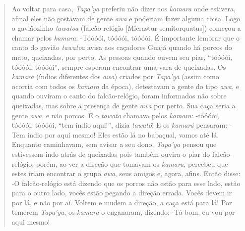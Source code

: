 \begin{quote}
Ao voltar para casa, \emph{Tapa'ya} preferiu não dizer aos \emph{kamara}
onde estivera, afinal eles não gostavam de gente \emph{awa} e poderiam
fazer alguma coisa. Logo o gaviãozinho \emph{tawatoa} (falcão-relógio
{[}Micrastur semitorquatus{]}) começou a chamar pelos \emph{kamara}:
-Tóóóói, tóóóói, tóóóói. É importante lembrar que o canto do gavião
\emph{tawatoa} avisa aos caçadores Guajá quando há porcos do mato,
queixadas, por perto. As pessoas quando ouvem seu piar, ``tóóóói,
tóóóói, tóóóói'', sempre esperam encontrar uma vara de queixadas. Os
\emph{kamara} (índios diferentes dos \emph{awa}) criados por
\emph{Tapa'ya} (assim como ocorria com todos os \emph{kamara} da época),
detestavam a gente do tipo \emph{awa}, e quando ouviram o canto do
falcão-relógio, foram informados não sobre queixadas, mas sobre a
presença de gente \emph{awa} por perto. Sua caça seria a gente
\emph{awa}, e não porcos. E o \emph{tawato} chamava pelos \emph{kamara}:
-tóóóói, tóóóói, tóóóói, ``tem índio aqui!'', dizia \emph{tawató}! E os
\emph{kamará} pensaram: -Tem índio por aqui mesmo! Eles estão lá no
babaçual, vamos até lá. Enquanto caminhavam, sem avisar a seu dono,
\emph{Tapa'ya} pensou que estivessem indo atrás de queixadas pois também
ouvira o piar do falcão-relógio; porém, ao ver a direção que tomavam os
\emph{kamara}, percebeu que estes iriam encontrar o grupo \emph{awa},
seus amigos e, agora, afins. Então disse: -O falcão-relógio está dizendo
que os porcos não estão para esse lado, estão para o outro lado, vocês
estão pegando a direção errada. Vocês devem ir por lá, e não por aí.
Voltem e mudem a direção, a caça está para lá! Por temerem
\emph{Tapa'ya}, os \emph{kamara} o enganaram, dizendo: -Tá bom, eu vou
por aqui mesmo!


\end{quote}
